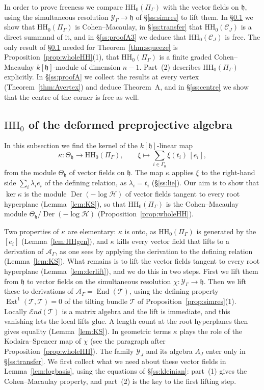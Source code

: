 \documentclass[11pt]{amsart}
\numberwithin{table}{section}
\numberwithin{figure}{section}
\numberwithin{equation}{section}
\theoremstyle{definition}
\theoremstyle{plain}
\newcommand{\cC}{\mathcal{C}}
\newcommand{\cA}{\mathcal{A}}
\newcommand{\cY}{\mathcal{Y}}
\newcommand{\h}{\mathfrak{h}}
\newcommand{\HH}{\mathrm{HH}}
\DeclareMathOperator{\End}{End}
\DeclareMathOperator{\Ext}{Ext}
\DeclareMathOperator{\Der}{Der}
\newcommand{\sEnd}{\mathscr{E}\!nd}
\begin{document}
In order to prove freeness we compare $\HH_0(\Pi_\Gamma)$ with the vector fields on $\h$, using the simultaneous resolution $\cY_\Gamma \to \h$ of \S\ref{ss:simres} to lift them. In \S\ref{ss:wholeHH} we show that $\HH_0(\Pi_\Gamma)$ is Cohen--Macaulay, in \S\ref{ss:transfer} that $\HH_0(\cC_J)$ is a direct summand of it, and in \S\ref{ss:proofA3} we deduce that $\HH_0(\cC_J)$ is free. The only result of \S\ref{ss:wholeHH} needed for Theorem~\ref{thm:squeeze} is Proposition~\ref{prop:wholeHH}(1), that $\HH_0(\Pi_\Gamma)$ is a finite graded Cohen--Macaulay $k[\h]$-module of dimension $n - 1$. Part~(2) describes $\HH_0(\Pi_\Gamma)$ explicitly. In \S\ref{ss:proofA} we collect the results at every vertex (Theorem~\ref{thm:Avertex}) and deduce Theorem~A, and in \S\ref{ss:centre} we show that the centre of the corner is free as well.

\subsection{\texorpdfstring{$\HH_0$ of the deformed preprojective algebra}{HH0 of the deformed preprojective algebra}}\label{ss:wholeHH}

In this subsection we find the kernel of the $k[\h]$-linear map
\[
\kappa\colon \Theta_\h \to \HH_0(\Pi_\Gamma), \qquad \xi \mapsto \textstyle\sum_{i \in \Gamma_0} \xi(t_i)\,[e_i],
\]
from the module $\Theta_\h$ of vector fields on $\h$. The map $\kappa$ applies $\xi$ to the right-hand side $\sum_i \lambda_i e_i$ of the defining relation, as $\lambda_i = t_i$ (\S\ref{ss:lie}). Our aim is to show that $\ker\kappa$ is the module $\Der(-\log\mathcal H)$ of vector fields tangent to every root hyperplane (Lemma~\ref{lem:KS}), so that $\HH_0(\Pi_\Gamma)$ is the Cohen--Macaulay module $\Theta_\h/\Der(-\log\mathcal H)$ (Proposition~\ref{prop:wholeHH}).

Two properties of $\kappa$ are elementary: $\kappa$ is onto, as $\HH_0(\Pi_\Gamma)$ is generated by the $[e_i]$ (Lemma~\ref{lem:HHgen}), and $\kappa$ kills every vector field that lifts to a derivation of $\cA_\Gamma$, as one sees by applying the derivation to the defining relation (Lemma~\ref{lem:KS}). What remains is to lift the vector fields tangent to every root hyperplane (Lemma~\ref{lem:derlift}), and we do this in two steps. First we lift them from $\h$ to vector fields on the simultaneous resolution $\chi\colon \cY_\Gamma \to \h$. Then we lift these to derivations of $\cA_\Gamma = \End(\mathcal T)$, using the defining property $\Ext^1(\mathcal T, \mathcal T) = 0$ of the tilting bundle $\mathcal T$ of Proposition~\ref{prop:simres}(1). Locally $\sEnd(\mathcal T)$ is a matrix algebra and the lift is immediate, and this vanishing lets the local lifts glue. A length count at the root hyperplanes then gives equality (Lemma~\ref{lem:KS}). In geometric terms $\kappa$ plays the role of the Kodaira--Spencer map of $\chi$ (see the paragraph after Proposition~\ref{prop:wholeHH}). The family $\cY_J$ and its algebra $A_J$ enter only in \S\ref{ss:transfer}. We first collect what we need about these vector fields in Lemma~\ref{lem:logbasis}, using the equations of \S\ref{ss:kleinian}: part~(1) gives the Cohen--Macaulay property, and part~(2) is the key to the first lifting step.
\end{document}

